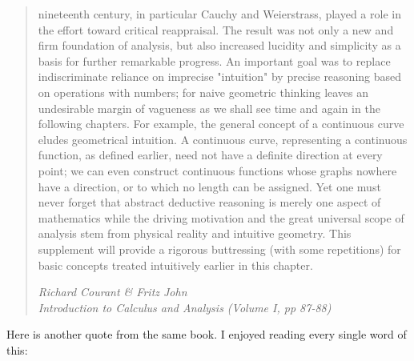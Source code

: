 \documentclass[11pt,a4paper]{article}
\begin{document}
\begin{quote}
	nineteenth century, in particular Cauchy and Weierstrass, played a role
	in the effort toward critical reappraisal. The result was not only a
	new and firm foundation of analysis, but also increased lucidity and
	simplicity as a basis for further remarkable progress.
	An important goal was to replace indiscriminate reliance on imprecise
	"intuition" by precise reasoning based on operations with numbers; for
	naive geometric thinking leaves an undesirable margin of vagueness as
	we shall see time and again in the following chapters. For example,
	the general concept of a continuous curve eludes geometrical intuition.
	A continuous curve, representing a continuous function, as defined
	earlier, need not have a definite direction at every point; we can even
	construct continuous functions whose graphs nowhere have a direction,
	or to which no length can be assigned.
	Yet one must never forget that abstract deductive reasoning is
	merely one aspect of mathematics while the driving motivation and the
	great universal scope of analysis stem from physical reality and
	intuitive geometry.
	This supplement will provide a rigorous buttressing (with some
	repetitions) for basic concepts treated intuitively earlier in this chapter. 
	
	\textit{Richard Courant \& Fritz John \\ 
		Introduction to Calculus and Analysis (Volume I, pp 87-88)}
\end{quote}

Here is another quote from the same book. I enjoyed reading every single word of this:
\end{document}
